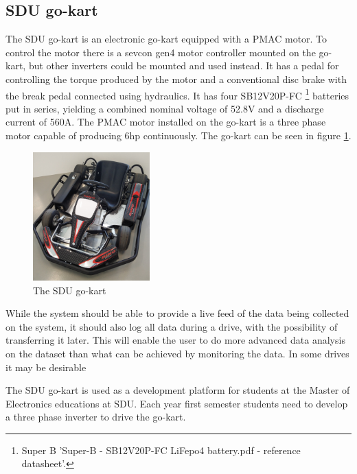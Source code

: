 \subsection{SDU go-kart}
The SDU go-kart is an electronic go-kart equipped with a PMAC motor. 
To control the motor there is a sevcon gen4 motor controller mounted on the go-kart, but other inverters could be mounted and used instead.
It has a pedal for controlling the torque produced by the motor and a conventional disc brake with the break pedal connected using hydraulics.
It has four SB12V20P-FC \footnote{Super B 'Super-B - SB12V20P-FC LiFepo4 battery.pdf - reference datasheet'.} batteries put in series, yielding a combined nominal voltage of 52.8V and a discharge current of 560A.
The PMAC motor installed on the go-kart is a three phase motor capable of producing 6hp continuously.
The go-kart can be seen in figure \ref{fig:go_kart}.

\begin{figure}[h]
 	\centering
    \includegraphics[width=0.4\textwidth]{graphics/go_kart}
    \caption{The SDU go-kart}
    \label{fig:go_kart}
\end{figure}

While the system should be able to provide a live feed of the data being collected on the system, it should also log all data during a drive, with the possibility of transferring it later.
This will enable the user to do more advanced data analysis on the dataset than what can be achieved by monitoring the data.
In some drives it may be desirable


The SDU go-kart is used as a development platform for students at the Master of Electronics educations at SDU.
Each year first semester students need to develop a three phase inverter to drive the go-kart.

